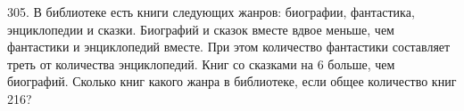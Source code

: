 305. В библиотеке есть книги следующих жанров: биографии, фантастика, энциклопедии и сказки. Биографий и сказок вместе вдвое меньше, чем фантастики и энциклопедий вместе. При этом количество фантастики составляет треть от количества энциклопедий. Книг со сказками на 6 больше, чем биографий. Сколько книг какого жанра в библиотеке, если общее количество книг 216?\\
